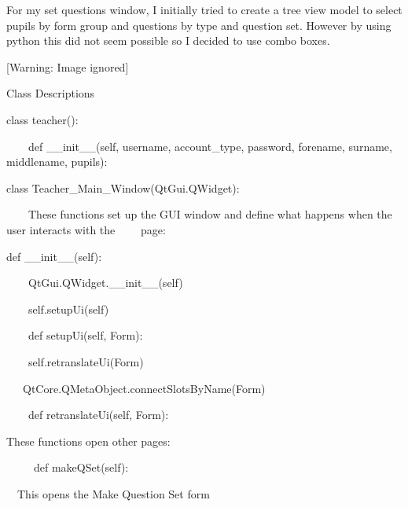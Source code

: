 \documentclass{article}
\begin{document}
\bigskip


\bigskip


\bigskip


\bigskip


\bigskip


\bigskip


\bigskip


\bigskip

For my set questions window, I initially tried to create a tree view model to select pupils by form group and questions by type and question set. However by using python this did not seem possible so I decided to use combo boxes.

\begin{center}
 [Warning: Image ignored] %

\end{center}

\bigskip


\bigskip


\bigskip


\bigskip


\bigskip

Class Descriptions

class teacher():

\ \ \ \ def \_\_init\_\_(self, username, account\_type, password, forename, surname, middlename, pupils):


\bigskip

class Teacher\_Main\_Window(QtGui.QWidget):

\ \ \ \ These functions set up the GUI window and define what happens when the user interacts with the \ \ \ \ page:

def \_\_init\_\_(self):

\ \ \ \ QtGui.QWidget.\_\_init\_\_(self)

\ \ \ \ self.setupUi(self)

\ \ \ \ def setupUi(self, Form):

\ \ \ \ self.retranslateUi(Form)

\ \ \ QtCore.QMetaObject.connectSlotsByName(Form) \ \ \ \ \ \ \ \ \ \ \ 

\ \ \ \ def retranslateUi(self, Form):

These functions open other pages:

\ \ \ \ \ def makeQSet(self):

\ \ This opens the Make Question Set form
\end{document}
